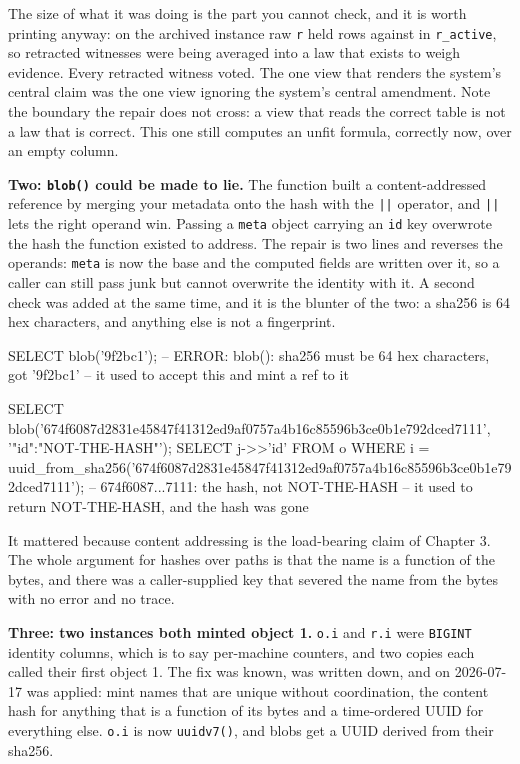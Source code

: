The size of what it was doing is the part you cannot check, and it is worth printing anyway: on the archived instance raw \texttt{r} held \labLineageRelations{} rows against \labLineageActive{} in \texttt{r\_active}, so \labLineageRetracted{} retracted witnesses were being averaged into a law that exists to weigh evidence. Every retracted witness voted. The one view that renders the system's central claim was the one view ignoring the system's central amendment. Note the boundary the repair does not cross: a view that reads the correct table is not a law that is correct. This one still computes an unfit formula, correctly now, over an empty column.

\textbf{Two: \texttt{blob()} could be made to lie.} The function built a content-addressed reference by merging your metadata onto the hash with the \texttt{||} operator, and \texttt{||} lets the right operand win. Passing a \texttt{meta} object carrying an \texttt{id} key overwrote the hash the function existed to address. The repair is two lines and reverses the operands: \texttt{meta} is now the base and the computed fields are written over it, so a caller can still pass junk but cannot overwrite the identity with it. A second check was added at the same time, and it is the blunter of the two: a sha256 is 64 hex characters, and anything else is not a fingerprint.

\begin{Check}
SELECT blob('9f2bc1');
--   ERROR: blob(): sha256 must be 64 hex characters, got '9f2bc1'
--   it used to accept this and mint a ref to it

SELECT blob('674f6087d2831e45847f41312ed9af0757a4b16c85596b3ce0b1e792dced7111',
            '{"id":"NOT-THE-HASH"}');
SELECT j->>'id' FROM o
 WHERE i = uuid_from_sha256('674f6087d2831e45847f41312ed9af0757a4b16c85596b3ce0b1e792dced7111');
--   674f6087...7111: the hash, not NOT-THE-HASH
--   it used to return NOT-THE-HASH, and the hash was gone
\end{Check}

It mattered because content addressing is the load-bearing claim of Chapter 3. The whole argument for hashes over paths is that the name is a function of the bytes, and there was a caller-supplied key that severed the name from the bytes with no error and no trace.

\textbf{Three: two instances both minted object 1.} \texttt{o.i} and \texttt{r.i} were \texttt{BIGINT} identity columns, which is to say per-machine counters, and two copies each called their first object 1. The fix was known, was written down, and on 2026-07-17 was applied: mint names that are unique without coordination, the content hash for anything that is a function of its bytes and a time-ordered UUID for everything else. \texttt{o.i} is now \texttt{uuidv7()}, and blobs get a UUID derived from their sha256.

